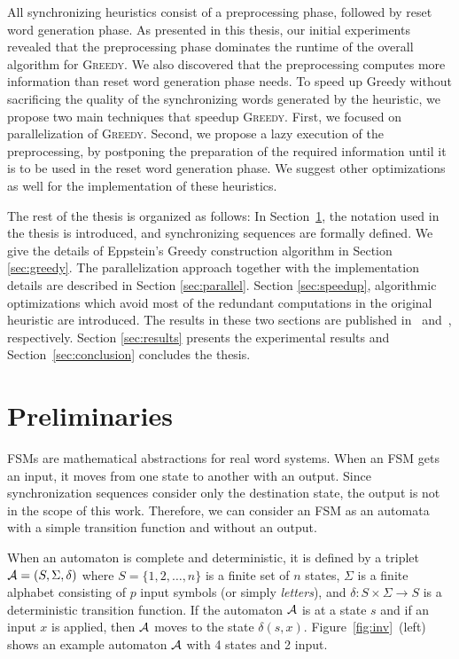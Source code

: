 \documentclass[12pt]{article}
\newcommand{\kkcomm}[1]{{\color{red}{\bf kk: #1}}}
\newcommand{\greedyAlgo}{\textsc{Greedy}}
\begin{document}
All synchronizing heuristics consist of a preprocessing phase, followed by reset word generation phase. As presented in this thesis, our initial experiments revealed that the preprocessing phase dominates the runtime of the overall algorithm for \textsc{Greedy}. We also discovered that the preprocessing computes more information than reset word generation phase needs.  To speed up Greedy without sacrificing the
quality of the synchronizing words generated by the heuristic, we propose two main techniques that speedup \greedyAlgo . First, we focused on parallelization of \textsc{Greedy}. Second, we propose a lazy execution of the preprocessing, by postponing the preparation of the required information until it is to be used in the reset word generation phase. We suggest other optimizations as well for the implementation of these heuristics. 

The rest of the thesis is organized as follows: In Section~\ref{sec:Preliminaries}, the notation used in the thesis is introduced, and synchronizing sequences are formally defined. We give the details of Eppstein's {\sc Greedy} construction algorithm in Section \ref{sec:greedy}. The parallelization approach together with the implementation details are described in Section \ref{sec:parallel}. Section \ref{sec:speedup}, algorithmic optimizations which avoid most of the redundant computations in the original heuristic are introduced. 
The results in these two sections are published in~\cite{} and~\cite{}, respectively. \kkcomm{Sertac makalelerine referans verebilirsin} 
Section \ref{sec:results} presents the experimental results and Section~\ref{sec:conclusion} concludes the thesis.

\clearpage
\section{Preliminaries}
\label{sec:Preliminaries}
FSMs are mathematical abstractions for real word systems. When an FSM gets an input, it moves from one state to another with an output. Since synchronization sequences consider only the destination state, the output is not in the scope of this work. Therefore, we can consider an FSM as an automata with a simple transition function and without an output.

When an automaton is complete and deterministic, it is defined by a triplet ${\cal A}=(S, \Sigma, \delta)$  where $S = \{1, 2, \ldots, n\}$ is a finite set of $n$ states, $\Sigma$ is a finite alphabet consisting of $p$ input symbols (or simply {\em letters}), and $\delta : S \times \Sigma \rightarrow S$ is a deterministic transition function. If the automaton ${\cal A}$ is at a state $s$ and if an input $x$ is applied, then ${\cal A}$ moves to the state $\delta(s,x)$. Figure~\ref{fig:inv}~(left) shows an example automaton ${\cal A}$ with 4 states and 2 input.
\end{document}
